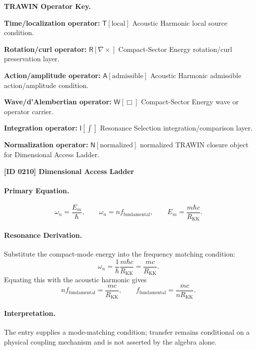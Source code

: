 \par\vspace{0.45\baselineskip}
\noindent\begin{minipage}[t]{\linewidth}
\begingroup
\small
\raggedright
\textbf{TRAWIN Operator Key.}\par
\noindent\textbf{Time/localization operator:} $\mathsf{T}\!\left[\mathrm{local}\right]$ Acoustic Harmonic local source condition.\par
\noindent\textbf{Rotation/curl operator:} $\mathsf{R}\!\left[\nabla\times\right]$ Compact-Sector Energy rotation/curl preservation layer.\par
\noindent\textbf{Action/amplitude operator:} $\mathsf{A}\!\left[\mathrm{admissible}\right]$ Acoustic Harmonic admissible action/amplitude condition.\par
\noindent\textbf{Wave/d'Alembertian operator:} $\mathsf{W}\!\left[\Box\right]$ Compact-Sector Energy wave or operator carrier.\par
\noindent\textbf{Integration operator:} $\mathsf{I}\!\left[\int\right]$ Resonance Selection integration/comparison layer.\par
\noindent\textbf{Normalization operator:} $\mathsf{N}\!\left[\mathrm{normalized}\right]$ normalized TRAWIN closure object for Dimensional Access Ladder.\par
\endgroup
\end{minipage}

\clearpage
\noindent\textbf{[ID 0210] Dimensional Access Ladder}\par
\vspace{0.35em}
\paragraph{Primary Equation.}
\[
\omega_n=\frac{E_m}{\hbar},\qquad \omega_n=n f_{\mathrm{fundamental}},\qquad E_m=\frac{m\hbar c}{R_{\mathrm{KK}}}.
\]
\paragraph{Resonance Derivation.}
Substitute the compact-mode energy into the frequency matching condition:
\[
\omega_n=\frac{1}{\hbar}\frac{m\hbar c}{R_{\mathrm{KK}}}=\frac{m c}{R_{\mathrm{KK}}}.
\]
Equating this with the acoustic harmonic gives
\[
n f_{\mathrm{fundamental}}=\frac{m c}{R_{\mathrm{KK}}},\qquad f_{\mathrm{fundamental}}=\frac{m c}{n R_{\mathrm{KK}}}.
\]
\paragraph{Interpretation.}
The entry supplies a mode-matching condition; transfer remains conditional on a physical coupling mechanism and is not asserted by the algebra alone.

